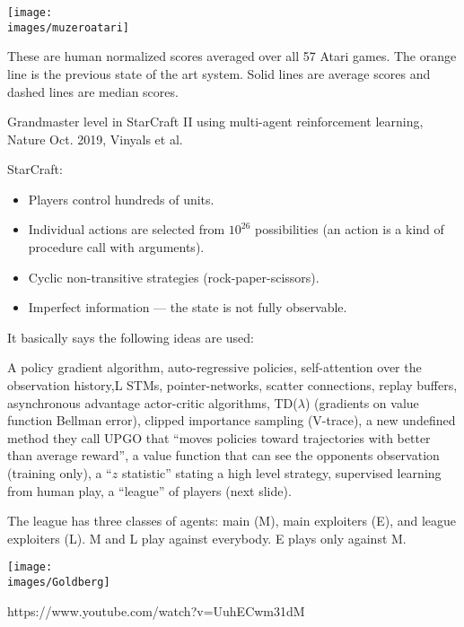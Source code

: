 {


\centerline{\texttt{[image: \\images/muzeroatari]}}

{\huge
  These are human normalized scores averaged over all 57 Atari games.  The orange line is the previous state of the art system.  Solid lines are average scores and dashed lines are median scores.
}



Grandmaster level in StarCraft II using multi-agent reinforcement learning, Nature Oct. 2019, Vinyals et al.

\vfill
StarCraft:

\begin{itemize}
\item Players control hundreds of units.

\vfill
\item Individual actions are selected from $10^{26}$ possibilities (an action is a kind of procedure call with arguments).

\vfill
\item Cyclic non-transitive strategies (rock-paper-scissors).

\vfill
\item Imperfect information --- the state is not fully observable.
\end{itemize}


It basically says the following ideas are used:

A policy gradient algorithm, auto-regressive policies, self-attention over the observation history,L STMs, pointer-networks, scatter connections,
replay buffers, asynchronous advantage actor-critic algorithms, TD($\lambda$) (gradients on value function Bellman error), clipped importance sampling
(V-trace), a new undefined method they call UPGO that ``moves policies toward trajectories with better than average reward'', a value function
that can see the opponents observation (training only), a ``$z$ statistic'' stating a high level strategy, 
supervised learning from human play, 
a ``league'' of players (next slide).


The league has three classes of agents: main (M), main exploiters (E), and league exploiters (L).  M and L play against everybody.
E plays only against M.


\centerline{\texttt{[image: \\images/Goldberg]}}


https://www.youtube.com/watch?v=UuhECwm31dM


}

